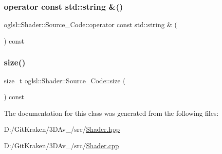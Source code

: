 \mbox{\label{classoglsl_1_1_shader_1_1_source___code_a1305244d85aabc655fba7cf4f55cc5b4}} 
\subsubsection{\texorpdfstring{operator const std\+::string \&()}{operator const std::string \&()}}
{\footnotesize\ttfamily oglsl\+::\+Shader\+::\+Source\+\_\+\+Code\+::operator const std\+::string \& (\begin{DoxyParamCaption}{ }\end{DoxyParamCaption}) const\hspace{0.3cm}{\ttfamily [inline]}}

\mbox{\label{classoglsl_1_1_shader_1_1_source___code_ab1ea89bfdad1d955982b2821457f9d13}} 
\subsubsection{\texorpdfstring{size()}{size()}}
{\footnotesize\ttfamily size\+\_\+t oglsl\+::\+Shader\+::\+Source\+\_\+\+Code\+::size (\begin{DoxyParamCaption}{ }\end{DoxyParamCaption}) const\hspace{0.3cm}{\ttfamily [inline]}}



The documentation for this class was generated from the following files\+:\begin{DoxyCompactItemize}
\item 
D\+:/\+Git\+Kraken/3\+D\+Av\+\_/src/\mbox{\hyperlink{_shader_8hpp}{Shader.\+hpp}}\item 
D\+:/\+Git\+Kraken/3\+D\+Av\+\_/src/\mbox{\hyperlink{_shader_8cpp}{Shader.\+cpp}}\end{DoxyCompactItemize}
